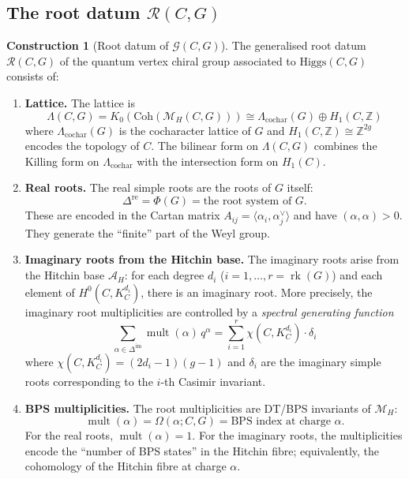 \documentclass[11pt]{article}
\theoremstyle{definition}
\newtheorem{construction}[theorem]{Construction}
\theoremstyle{remark}
\newcommand{\Higgs}{\mathrm{Higgs}}
\newcommand{\Coh}{\mathrm{Coh}}
\newcommand{\cA}{\mathcal{A}}
\newcommand{\cM}{\mathcal{M}}
\DeclareMathOperator{\rk}{rk}
\DeclareMathOperator{\mult}{mult}
\begin{document}
\subsection{The root datum $\mathcal{R}(C, G)$}

\begin{construction}[Root datum of $\mathcal{G}(C, G)$]
\label{constr:root-datum-hitchin}
The generalised root datum $\mathcal{R}(C, G)$ of the quantum vertex chiral group associated to $\Higgs(C, G)$ consists of:

\begin{enumerate}[label=(\roman*)]
 \item \textbf{Lattice.} The lattice is
 \[
 \Lambda(C, G) = K_0(\Coh(\cM_H(C, G))) \cong \Lambda_{\mathrm{cochar}}(G) \oplus H_1(C, \mathbb{Z})
 \]
 where $\Lambda_{\mathrm{cochar}}(G)$ is the cocharacter lattice of $G$ and $H_1(C, \mathbb{Z}) \cong \mathbb{Z}^{2g}$ encodes the topology of $C$. The bilinear form on $\Lambda(C, G)$ combines the Killing form on $\Lambda_{\mathrm{cochar}}$ with the intersection form on $H_1(C)$.

 \item \textbf{Real roots.} The real simple roots are the roots of $G$ itself:
 \[
 \Delta^{\mathrm{re}} = \Phi(G) = \text{the root system of } G.
 \]
 These are encoded in the Cartan matrix $A_{ij} = \langle \alpha_i, \alpha_j^\vee \rangle$ and have $(\alpha, \alpha) > 0$. They generate the ``finite'' part of the Weyl group.

 \item \textbf{Imaginary roots from the Hitchin base.} The imaginary roots arise from the Hitchin base $\cA_H$: for each degree $d_i$ ($i = 1, \ldots, r = \rk(G)$) and each element of $H^0(C, K_C^{d_i})$, there is an imaginary root. More precisely, the imaginary root multiplicities are controlled by a \emph{spectral generating function}
 \[
 \sum_{\alpha \in \Delta^{\mathrm{im}}} \mult(\alpha) \, q^\alpha = \sum_{i=1}^r \chi(C, K_C^{d_i}) \cdot \delta_i
 \]
 where $\chi(C, K_C^{d_i}) = (2d_i - 1)(g - 1)$ and $\delta_i$ are the imaginary simple roots corresponding to the $i$-th Casimir invariant.

 \item \textbf{BPS multiplicities.} The root multiplicities are DT/BPS invariants of $\cM_H$:
 \[
 \mult(\alpha) = \Omega(\alpha; C, G) = \text{BPS index at charge } \alpha.
 \]
 For the real roots, $\mult(\alpha) = 1$. For the imaginary roots, the multiplicities encode the ``number of BPS states'' in the Hitchin fibre; equivalently, the cohomology of the Hitchin fibre at charge $\alpha$.


\end{enumerate}
\end{construction}
\end{document}
